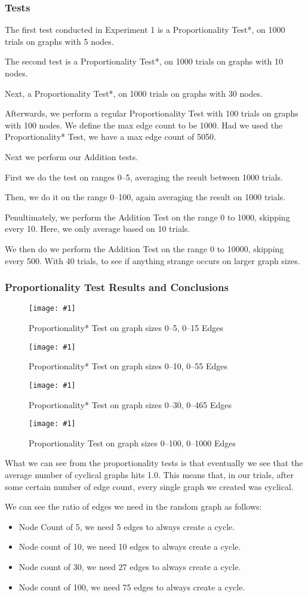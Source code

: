 \documentclass[12pt]{article}
\newcommand{\firgureBuffered}[2]
{
    \begin{figure}[ht!]
        \centering
        \texttt{[image: \#1]}
        \caption{#2}
    \end{figure}
}
\begin{document}
\subsubsection{Tests}

The first test conducted in Experiment 1 is a Proportionality Test*, on 1000 trials on graphs with 5 nodes.

The second test is a Proportionality Test*, on 1000 trials on graphs with 10 nodes.

Next, a Proportionality Test*, on 1000 trials on graphs with 30 nodes.

Afterwards, we perform a regular Proportionality Test with 100 trials on graphs with 100 nodes. We define the max edge count to be 1000. Had we used the Proportionality* Test, we have a max edge count of 5050.

Next we perform our Addition tests.

First we do the test on ranges 0--5, averaging the result between 1000 trials.

Then, we do it on the range 0--100, again averaging the result on 1000 trials.

Penultimately, we perform the Addition Test on the range 0 to 1000, skipping every 10. Here, we only average based on 10 trials.

We then do we perform the Addition Test on the range 0 to 10000, skipping every 500. With 40 trials, to see if anything strange occurs on larger graph sizes.


\subsubsection{Proportionality Test Results and Conclusions}

\FloatBarrier{}
\firgureBuffered{images/experiment1/exp1_a.png}{Proportionality* Test on graph sizes 0--5, 0--15 Edges}
\firgureBuffered{images/experiment1/exp1_b.png}{Proportionality* Test on graph sizes 0--10, 0--55 Edges}
\firgureBuffered{images/experiment1/exp1_c.png}{Proportionality* Test on graph sizes 0--30, 0--465 Edges}
\firgureBuffered{images/experiment1/exp1_d.png}{Proportionality Test on graph sizes 0--100, 0--1000 Edges}
\FloatBarrier{}

What we can see from the proportionality tests is that eventually we see that the average number of cyclical graphs hits 1.0. This means that, in our trials, after some certain number of edge count, every single graph we created was cyclical.

We can see the ratio of edges we need in the random graph as follows:
\begin{itemize}
    \item Node Count of 5, we need 5 edges to always create a cycle.
    \item Node count of 10, we need 10 edges to always create a cycle.
    \item Node count of 30, we need 27 edges to always create a cycle.
    \item Node count of 100, we need 75 edges to always create a cycle.
\end{itemize}
\end{document}
